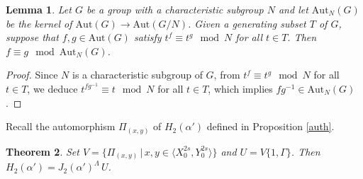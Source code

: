 \documentclass{amsart}
\newtheorem{theorem}{Theorem}[section]
\newtheorem{lemma}[theorem]{Lemma}
\theoremstyle{definition}
\theoremstyle{remark}
\begin{document}
\begin{lemma}\label{autlin} Let $G$ be a group with a characteristic subgroup $N$ and let
$\mathrm{Aut}_N(G)$ be the kernel of $\mathrm{Aut}(G)\to \mathrm{Aut}(G/N)$. Given a generating subset $T$
of $G$, suppose that $f,g\in \mathrm{Aut}(G)$ satisfy $t^f\equiv t^g\mod N$ for all $t\in T$. Then $f\equiv g\mod \mathrm{Aut}_N(G)$.
\end{lemma}

\begin{proof} Since $N$ is a characteristic subgroup of $G$, from $t^f\equiv t^g\mod N$ for all $t\in T$, we deduce
$t^{fg^{-1}}\equiv t\mod N$ for all $t\in T$, which implies $fg^{-1}\in \mathrm{Aut}_N(G)$.
\end{proof}

Recall the automorphism $\Pi_{(x,y)}$ of $H_2(\alpha')$ defined in Proposition \ref{auth}.

\begin{theorem}\label{indexj} Set $V=\{\Pi_{(x,y)}\,|\, x,y\in \langle X_0^{2s},Y_0^{2s}\rangle\}$ and $U=V\{1,\Gamma\}$.
Then $H_2(\alpha')=J_2(\alpha')^\Lambda\, U$.
\end{theorem}
\end{document}
